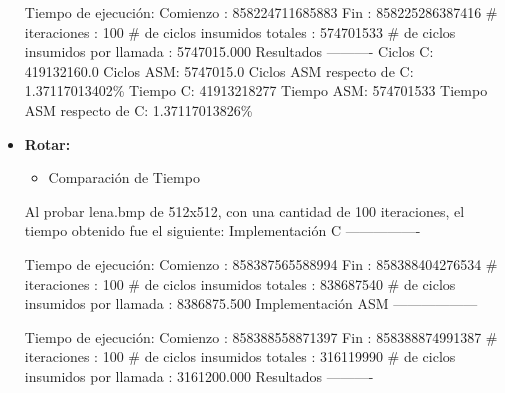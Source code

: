 \documentclass[10pt, a4paper]{article}
\begin{document}
\begin{itemize}
Tiempo de ejecución:\newline
  Comienzo                          : 858224711685883\newline
  Fin                               : 858225286387416\newline
  \# iteraciones                     : 100\newline
  \# de ciclos insumidos totales     : 574701533\newline
  \# de ciclos insumidos por llamada : 5747015.000\newline
\newline
Resultados\newline
----------
Ciclos C:                 419132160.0\newline
Ciclos ASM:               5747015.0\newline
Ciclos ASM respecto de C: 1.37117013402\%\newline
Tiempo C:                 41913218277\newline
Tiempo ASM:               574701533\newline
Tiempo ASM respecto de C: 1.37117013826\%\newline

\item {\textbf{Rotar:}} 

\begin{itemize}
\item{Comparación de Tiempo}
\end{itemize}
Al probar lena.bmp de 512x512, con una cantidad de 100 iteraciones, el tiempo obtenido fue el siguiente:\newline
Implementación C\newline
----------------

Tiempo de ejecución:\newline
  Comienzo                          : 858387565588994\newline
  Fin                               : 858388404276534\newline
  \# iteraciones                     : 100\newline
  \# de ciclos insumidos totales     : 838687540\newline
  \# de ciclos insumidos por llamada : 8386875.500\newline
\newline
Implementación ASM\newline
------------------

Tiempo de ejecución:\newline
  Comienzo                          : 858388558871397\newline
  Fin                               : 858388874991387\newline
  \# iteraciones                     : 100\newline
  \# de ciclos insumidos totales     : 316119990\newline
  \# de ciclos insumidos por llamada : 3161200.000\newline
\newline
Resultados\newline
----------


\end{itemize}
\end{document}
